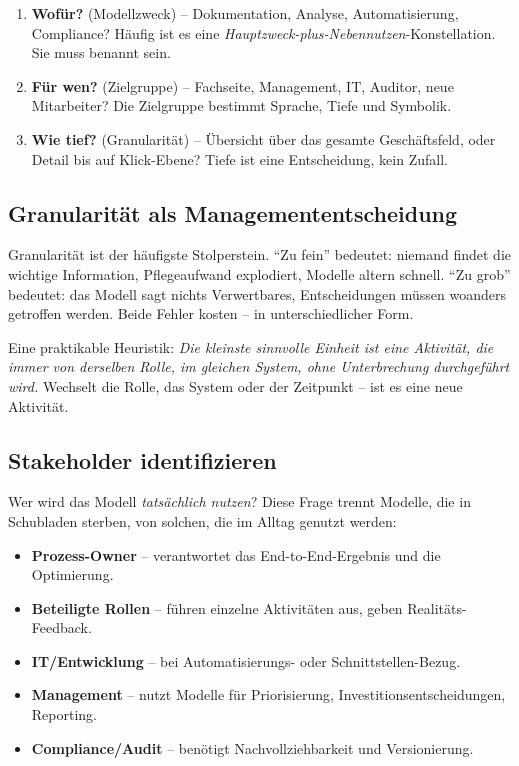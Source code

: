 \documentclass[11pt,a4paper,oneside]{article}
\begin{document}
\begin{enumerate}
  \item \textbf{Wofür?} (Modellzweck) -- Dokumentation, Analyse, Automatisierung, Compliance? Häufig ist es eine \emph{Hauptzweck-plus-Nebennutzen}-Konstellation. Sie muss benannt sein.
  \item \textbf{Für wen?} (Zielgruppe) -- Fachseite, Management, IT, Auditor, neue Mitarbeiter? Die Zielgruppe bestimmt Sprache, Tiefe und Symbolik.
  \item \textbf{Wie tief?} (Granularität) -- Übersicht über das gesamte Geschäftsfeld, oder Detail bis auf Klick-Ebene? Tiefe ist eine Entscheidung, kein Zufall.
\end{enumerate}

\subsection{Granularität als Managemententscheidung}

Granularität ist der häufigste Stolperstein. ``Zu fein'' bedeutet: niemand findet die wichtige Information, Pflegeaufwand explodiert, Modelle altern schnell. ``Zu grob'' bedeutet: das Modell sagt nichts Verwertbares, Entscheidungen müssen woanders getroffen werden. Beide Fehler kosten -- in unterschiedlicher Form.

Eine praktikable Heuristik: \emph{Die kleinste sinnvolle Einheit ist eine Aktivität, die immer von derselben Rolle, im gleichen System, ohne Unterbrechung durchgeführt wird.} Wechselt die Rolle, das System oder der Zeitpunkt -- ist es eine neue Aktivität.

\subsection{Stakeholder identifizieren}

Wer wird das Modell \emph{tatsächlich nutzen}? Diese Frage trennt Modelle, die in Schubladen sterben, von solchen, die im Alltag genutzt werden:

\begin{itemize}
  \item \textbf{Prozess-Owner} -- verantwortet das End-to-End-Ergebnis und die Optimierung.
  \item \textbf{Beteiligte Rollen} -- führen einzelne Aktivitäten aus, geben Realitäts-Feedback.
  \item \textbf{IT/Entwicklung} -- bei Automatisierungs- oder Schnittstellen-Bezug.
  \item \textbf{Management} -- nutzt Modelle für Priorisierung, Investitionsentscheidungen, Reporting.
  \item \textbf{Compliance/Audit} -- benötigt Nachvollziehbarkeit und Versionierung.
\end{itemize}
\end{document}
